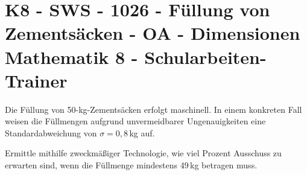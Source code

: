 \section{K8 - SWS - 1026 - Füllung von Zementsäcken - OA - Dimensionen Mathematik 8 - Schularbeiten-Trainer}

\begin{beispiel}[K8 - SWS]{1}
Die Füllung von 50-kg-Zementsäcken erfolgt maschinell. In einem konkreten Fall weisen die Füllmengen aufgrund unvermeidbarer Ungenauigkeiten eine Standardabweichung von $\sigma=0,8$\,kg auf.

Ermittle mithilfe zweckmäßiger Technologie, wie viel Prozent Ausschuss zu erwarten sind, wenn die Füllmenge mindestens 49\,kg betragen muss.

\end{beispiel}